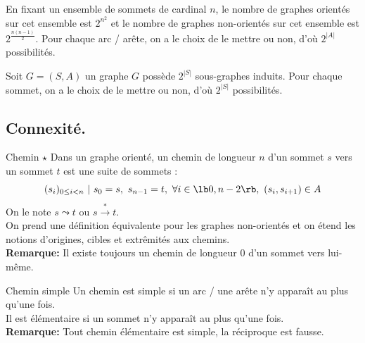 \documentclass[french, 11pt]{article}
\begin{document}
\begin{corr}{}{}
    En fixant un ensemble de sommets de cardinal $n$, le nombre de graphes orientés sur cet ensemble est $2^{n^2}$ et le nombre de graphes non-orientés sur cet ensemble est $2^{\frac{n(n-1)}{2}}$.
    \tcblower
     Pour chaque arc / arête, on a le choix de le mettre ou non, d'où $2^{|A|}$ possibilités.
\end{corr}

\begin{prop}{}{}
    Soit $G=(S,A)$ un graphe $G$ possède $2^{|S|}$ sous-graphes induits.
    \tcblower
    Pour chaque sommet, on a le choix de le mettre ou non, d'où $2^{|S|}$ possibilités.
\end{prop}

\vspace*{-0.5cm}

\subsection{Connexité.}

\begin{defi}{Chemin $\star$}{}
    Dans un graphe orienté, un chemin de longueur $n$ d'un sommet $s$ vers un sommet $t$ est une suite de sommets :
    \begin{equation*}
        (s_i)_{0\leq i<n} ~ | ~ s_0=s, ~ s_{n-1}=t, ~ \forall i\in\lb0,n-2\rb, ~ (s_i,s_{i+1}) \in A
    \end{equation*}
    On le note $s\leadsto t$ ou $s\overset{*}{\to}t$.\\
    On prend une définition équivalente pour les graphes non-orientés et on étend les notions d'origines, cibles et extrêmités aux chemins.\\
    \textbf{Remarque:} Il existe toujours un chemin de longueur 0 d'un sommet vers lui-même.
\end{defi}

\vspace*{-0.5cm}

\begin{defi}{Chemin simple}{}
    Un chemin est simple si un arc / une arête n'y apparaît au plus qu'une fois.\\
    Il est élémentaire si un sommet n'y apparaît au plus qu'une fois.\\
    \textbf{Remarque:} Tout chemin élémentaire est simple, la réciproque est fausse.
\end{defi}

\vspace*{-0.5cm}
\end{document}
